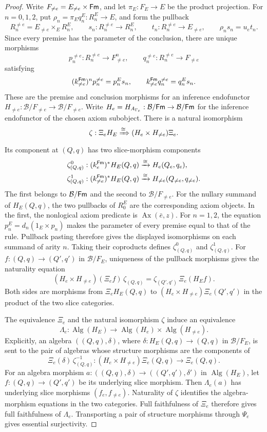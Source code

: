 \begin{proof}
Write $F_{\ne e}=E_{\ne e}\times\mathsf{Fm}$, and let
$\pi_E:F_E\to E$ be the product projection. For $n=0,1,2$,
put $\rho_n=\pi_Eq_n^E:R_n^E\to E$, and form the pullback
\[
 R_n^{\ne e}=E_{\ne e}\times_E R_n^E,
 \qquad s_n:R_n^{\ne e}\to R_n^E,
 \qquad t_n:R_n^{\ne e}\to E_{\ne e},
 \qquad \rho_ns_n=u_et_n.
\]
Since every premise has the parameter of the conclusion, there
are unique morphisms
\[
 p_n^{\ne e}:R_n^{\ne e}\to F_{\ne e}^n,
 \qquad q_n^{\ne e}:R_n^{\ne e}\to F_{\ne e}
\]
satisfying
\[
 (k_{\ne e}^{\mathsf{Fm}})^n p_n^{\ne e}=p_n^Es_n,
 \qquad k_{\ne e}^{\mathsf{Fm}}q_n^{\ne e}=q_n^Es_n.
\]
These are the premise and conclusion morphisms for an inference
endofunctor
$H_{\ne e}:\mathcal B/F_{\ne e}\to\mathcal B/F_{\ne e}$.
Write $H_e=H_{A_{\Gamma_e}}:\mathcal B/\mathsf{Fm}\to\mathcal B/\mathsf{Fm}$
for the inference endofunctor of the chosen axiom subobject.
There is a natural isomorphism
\[
 \zeta:\Xi_eH_E\xRightarrow{\cong}
                 (H_e\times H_{\ne e})\Xi_e.
\]
Its component at $(Q,q)$ has two slice-morphism components
\[
 \begin{aligned}
 \zeta^0_{(Q,q)}&:(k_e^{\mathsf{Fm}})^*H_E(Q,q)\xrightarrow{\cong}
                                      H_e(Q_e,q_e),\\
 \zeta^1_{(Q,q)}&:(k_{\ne e}^{\mathsf{Fm}})^*H_E(Q,q)\xrightarrow{\cong}
                                      H_{\ne e}(Q_{\ne e},q_{\ne e}).
 \end{aligned}
\]
The first belongs to $\mathcal B/\mathsf{Fm}$ and the second to
$\mathcal B/F_{\ne e}$.
For the nullary summand of $H_E(Q,q)$, the two pullbacks of
$R_0^E$ are the corresponding axiom objects. In the first,
the nonlogical axiom predicate is $\operatorname{Ax}(\bar e,z)$.
For $n=1,2$, the equation $p_n^E=d_n(1_E\times p_n)$ makes
the parameter of every premise equal to that of the rule.
Pullback pasting therefore gives the displayed isomorphisms on
each summand of arity $n$. Taking their coproducts defines
$\zeta^0_{(Q,q)}$ and $\zeta^1_{(Q,q)}$.
For $f:(Q,q)\to(Q',q')$ in $\mathcal B/F_E$, uniqueness
of the pullback morphisms gives the naturality equation
\[
 (H_e\times H_{\ne e})(\Xi_e f)\,\zeta_{(Q,q)}
   =\zeta_{(Q',q')}\,\Xi_e(H_Ef).
\]
Both sides are morphisms from $\Xi_eH_E(Q,q)$ to
$(H_e\times H_{\ne e})\Xi_e(Q',q')$ in the product of
the two slice categories.

The equivalence $\Xi_e$ and the natural isomorphism $\zeta$
induce an equivalence
\[
 \Lambda_e:\operatorname{Alg}(H_E)\longrightarrow
             \operatorname{Alg}(H_e)\times
             \operatorname{Alg}(H_{\ne e}).
\]
Explicitly, an algebra $((Q,q),\delta)$, where
$\delta:H_E(Q,q)\to(Q,q)$ in $\mathcal B/F_E$, is sent
to the pair of algebras whose structure morphisms are the
components of
\[
 \Xi_e(\delta)\,\zeta_{(Q,q)}^{-1}:
 (H_e\times H_{\ne e})\Xi_e(Q,q)\longrightarrow\Xi_e(Q,q).
\]
For an algebra morphism
$a:((Q,q),\delta)\to((Q',q'),\delta')$ in
$\operatorname{Alg}(H_E)$, let
$f:(Q,q)\to(Q',q')$ be its underlying slice morphism.
Then $\Lambda_e(a)$ has underlying slice morphisms
$(f_e,f_{\ne e})$. Naturality of $\zeta$ identifies the
algebra-morphism equations in the two categories. Full faithfulness
of $\Xi_e$ therefore gives full faithfulness of $\Lambda_e$.
Transporting a pair of structure morphisms through $\Psi_e$
gives essential surjectivity.


\end{proof}
